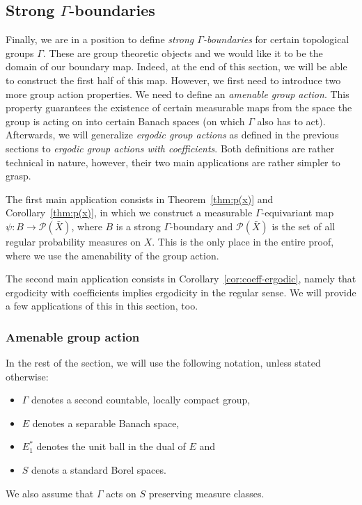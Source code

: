 \subsection{Strong \(\Gamma\)-boundaries}
\label{sec:grp-boundary}

Finally, we are in a position to define \emph{strong \(\Gamma\)-boundaries} for certain topological groups \(\Gamma\). These are group theoretic objects and we would like it to be the domain of our boundary map. Indeed, at the end of this section, we will be able to construct the first half of this map. However, we first need to introduce two more group action properties. We need to define an \emph{amenable group action}. This property guarantees the existence of certain measurable maps from the space the group is acting on into certain Banach spaces (on which \(\Gamma\) also has to act). Afterwards, we will generalize \emph{ergodic group actions} as defined in the previous sections to \emph{ergodic group actions with coefficients}. Both definitions are rather technical in nature, however, their two main applications are rather simpler to grasp.

The first main application consists in Theorem~\ref{thm:p(x)} and Corollary~\ref{thm:p(x)}, in which we construct a measurable \(\Gamma\)-equivariant map  \(\psi\colon B \to \mathcal{P}(\bar X)\), where \(B\) is a strong \(\Gamma\)-boundary and \(\mathcal{P}(\bar X)\) is the set of all regular probability measures on \(X\). This is the only place in the entire proof, where we use the amenability of the group action.

The second main application consists in Corollary~\ref{cor:coeff-ergodic}, namely that ergodicity with coefficients implies ergodicity in the regular sense. We will provide a few applications of this in this section, too.

\subsubsection*{Amenable group action}
\label{sec:amenable}

In the rest of the section, we will use the following notation, unless stated otherwise:
\begin{itemize}
\item \(\Gamma\) denotes a second countable, locally compact group,
\item \(E\) denotes a separable Banach space,
\item \(E^\ast_1\) denotes the unit ball in the dual of \(E\) and
\item \(S\) denots a standard Borel spaces.
\end{itemize}
We also assume that \(\Gamma\) acts on \(S\) preserving measure classes.


